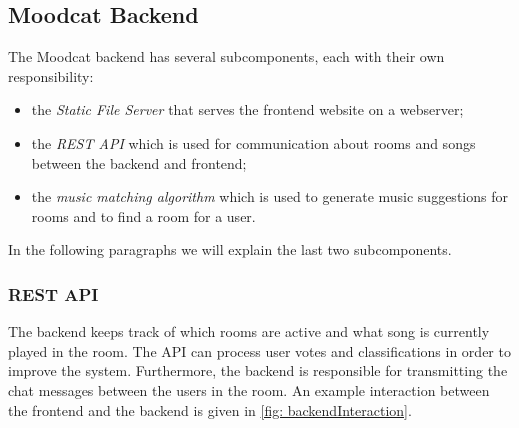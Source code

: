 \subsection{Moodcat Backend}
The Moodcat backend has several subcomponents, each with their own responsibility:
\begin{itemize}
\item the \textit{Static File Server} that serves the frontend website on a webserver;
\item the \textit{REST API} which is used for communication about rooms and songs between the backend and frontend;
\item the \textit{music matching algorithm} which is used to generate music suggestions for rooms and to find a room for a user.
\end{itemize}
In the following paragraphs we will explain the last two subcomponents.

\subsubsection{REST API}
The backend keeps track of which rooms are active and what song is currently played in the room.
The API can process user votes and classifications in order to improve the system.
Furthermore, the backend is responsible for transmitting the chat messages between the users in the room.
An example interaction between the frontend and the backend is given in \ref{fig: backendInteraction}.

